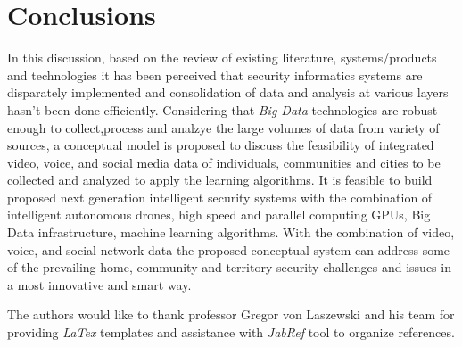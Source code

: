 \documentclass[sigconf]{acmart}
\begin{document}
\section{Conclusions}
In this discussion, based on the review of existing literature, systems/products and technologies it has been perceived that security informatics systems are disparately implemented and consolidation of data and analysis at various layers hasn't been done efficiently. Considering that \textit{Big Data} technologies are robust enough to collect,process and analzye the large volumes of data from variety of sources, a conceptual model is proposed to discuss the feasibility of integrated video, voice, and social media data of individuals, communities and cities to be collected and analyzed to apply the learning algorithms. It is feasible to build proposed next generation intelligent security systems with the combination of intelligent autonomous drones, high speed and parallel computing GPUs, Big Data infrastructure, machine learning algorithms. With the combination of video, voice, and social network data the proposed conceptual system can address some of the prevailing home, community and territory security challenges and issues in a most innovative and smart way.

\begin{acks}
The authors would like to thank professor Gregor von Laszewski and his team for providing \textit{LaTex} templates and assistance with \textit{JabRef} tool to organize references.
\end{acks}


 
\end{document}

